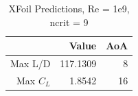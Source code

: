 \begin{table}[]
\caption{XFoil Predictions, Re = 1e9, ncrit = 9}
	\centering
	\begin{tabular}{|r|r|r|} \hline
				& Value	& AoA \\ \hline \hline
		Max L/D & 117.1309 & 8 \\ \hline
		Max $C_L$ & 1.8542 & 16 \\ \hline	
	\end{tabular}
\end{table}


